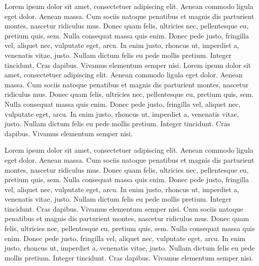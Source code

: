 \documentclass[DIV=calc, paper=a4, fontsize=12pt]{scrartcl}
\begin{document}
Lorem ipsum dolor sit amet, consectetuer adipiscing elit. Aenean commodo ligula eget dolor. Aenean massa. Cum sociis natoque penatibus et magnis dis parturient montes, nascetur ridiculus mus. Donec quam felis, ultricies nec, pellentesque eu, pretium quis, sem. Nulla consequat massa quis enim. Donec pede justo, fringilla vel, aliquet nec, vulputate eget, arcu. In enim justo, rhoncus ut, imperdiet a, venenatis vitae, justo. Nullam dictum felis eu pede mollis pretium. Integer tincidunt. Cras dapibus. Vivamus elementum semper nisi. Lorem ipsum dolor sit amet, consectetuer adipiscing elit. Aenean commodo ligula eget dolor. Aenean massa. Cum sociis natoque penatibus et magnis dis parturient montes, nascetur ridiculus mus. Donec quam felis, ultricies nec, pellentesque eu, pretium quis, sem. Nulla consequat massa quis enim. Donec pede justo, fringilla vel, aliquet nec, vulputate eget, arcu. In enim justo, rhoncus ut, imperdiet a, venenatis vitae, justo. Nullam dictum felis eu pede mollis pretium. Integer tincidunt. Cras dapibus. Vivamus elementum semper nisi.

Lorem ipsum dolor sit amet, consectetuer adipiscing elit. Aenean commodo ligula eget dolor. Aenean massa. Cum sociis natoque penatibus et magnis dis parturient montes, nascetur ridiculus mus. Donec quam felis, ultricies nec, pellentesque eu, pretium quis, sem. Nulla consequat massa quis enim. Donec pede justo, fringilla vel, aliquet nec, vulputate eget, arcu. In enim justo, rhoncus ut, imperdiet a, venenatis vitae, justo. Nullam dictum felis eu pede mollis pretium. Integer tincidunt. Cras dapibus. Vivamus elementum semper nisi. Cum sociis natoque penatibus et magnis dis parturient montes, nascetur ridiculus mus. Donec quam felis, ultricies nec, pellentesque eu, pretium quis, sem. Nulla consequat massa quis enim. Donec pede justo, fringilla vel, aliquet nec, vulputate eget, arcu. In enim justo, rhoncus ut, imperdiet a, venenatis vitae, justo. Nullam dictum felis eu pede mollis pretium. Integer tincidunt. Cras dapibus. Vivamus elementum semper nisi.
\end{document}
